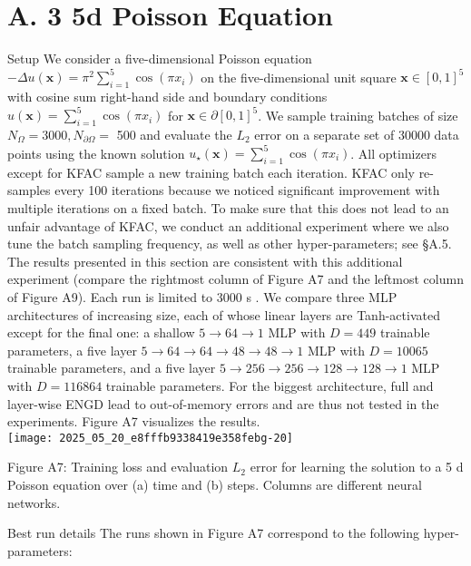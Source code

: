 \documentclass[10pt]{article}
\begin{document}
\section*{A. 3 5d Poisson Equation}
Setup We consider a five-dimensional Poisson equation $-\Delta u(\boldsymbol{x})=\pi^{2} \sum_{i=1}^{5} \cos \left(\pi x_{i}\right)$ on the five-dimensional unit square $\boldsymbol{x} \in[0,1]^{5}$ with cosine sum right-hand side and boundary conditions $u(\boldsymbol{x})=\sum_{i=1}^{5} \cos \left(\pi x_{i}\right)$ for $\boldsymbol{x} \in \partial[0,1]^{5}$. We sample training batches of size $N_{\Omega}=3000, N_{\partial \Omega}=$ 500 and evaluate the $L_{2}$ error on a separate set of 30000 data points using the known solution $u_{\star}(\boldsymbol{x})=\sum_{i=1}^{5} \cos \left(\pi x_{i}\right)$. All optimizers except for KFAC sample a new training batch each iteration. KFAC only re-samples every 100 iterations because we noticed significant improvement with multiple iterations on a fixed batch. To make sure that this does not lead to an unfair advantage of KFAC, we conduct an additional experiment where we also tune the batch sampling frequency, as well as other hyper-parameters; see §A.5. The results presented in this section are consistent with this additional experiment (compare the rightmost column of Figure A7 and the leftmost column of Figure A9). Each run is limited to 3000 s . We compare three MLP architectures of increasing size, each of whose linear layers are Tanh-activated except for the final one: a shallow $5 \rightarrow 64 \rightarrow 1$ MLP with $D=449$ trainable parameters, a five layer $5 \rightarrow 64 \rightarrow 64 \rightarrow 48 \rightarrow 48 \rightarrow 1$ MLP with $D=10065$ trainable parameters, and a five layer $5 \rightarrow 256 \rightarrow 256 \rightarrow 128 \rightarrow 128 \rightarrow 1$ MLP with $D=116864$ trainable parameters. For the biggest architecture, full and layer-wise ENGD lead to out-of-memory errors and are thus not tested in the experiments. Figure A7 visualizes the results.\\
\texttt{[image: 2025\_05\_20\_e8fffb9338419e358febg-20]}

Figure A7: Training loss and evaluation $L_{2}$ error for learning the solution to a 5 d Poisson equation over (a) time and (b) steps. Columns are different neural networks.

Best run details The runs shown in Figure A7 correspond to the following hyper-parameters:
\end{document}
